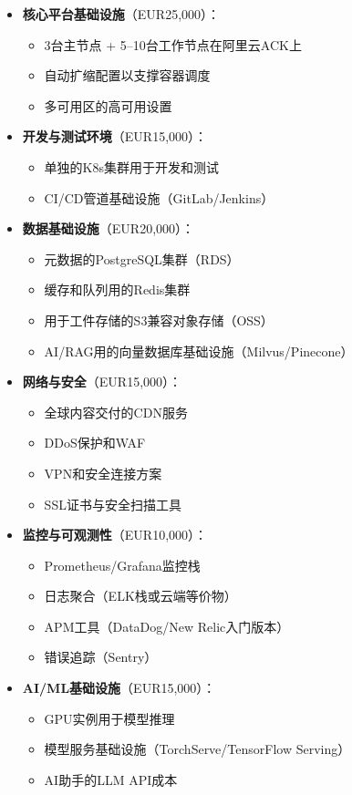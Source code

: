 \documentclass[11点, A4纸, 单面]{article}
\begin{document}
\begin{itemize}
    \item \textbf{核心平台基础设施}（EUR{25{,}000}）：
    \begin{itemize}
        \item 3台主节点 + 5--10台工作节点在阿里云ACK上
        \item 自动扩缩配置以支撑容器调度
        \item 多可用区的高可用设置
    \end{itemize}
    
    \item \textbf{开发与测试环境}（EUR{15{,}000}）：
    \begin{itemize}
        \item 单独的K8s集群用于开发和测试
        \item CI/CD管道基础设施（GitLab/Jenkins）
    \end{itemize}
    
    \item \textbf{数据基础设施}（EUR{20{,}000}）：
    \begin{itemize}
        \item 元数据的PostgreSQL集群（RDS）
        \item 缓存和队列用的Redis集群
        \item 用于工件存储的S3兼容对象存储（OSS）
        \item AI/RAG用的向量数据库基础设施（Milvus/Pinecone）
    \end{itemize}
    
    \item \textbf{网络与安全}（EUR{15{,}000}）：
    \begin{itemize}
        \item 全球内容交付的CDN服务
        \item DDoS保护和WAF
        \item VPN和安全连接方案
        \item SSL证书与安全扫描工具
    \end{itemize}
    
    \item \textbf{监控与可观测性}（EUR{10{,}000}）：
    \begin{itemize}
        \item Prometheus/Grafana监控栈
        \item 日志聚合（ELK栈或云端等价物）
        \item APM工具（DataDog/New Relic入门版本）
        \item 错误追踪（Sentry）
    \end{itemize}
    
    \item \textbf{AI/ML基础设施}（EUR{15{,}000}）：
    \begin{itemize}
        \item GPU实例用于模型推理
        \item 模型服务基础设施（TorchServe/TensorFlow Serving）
        \item AI助手的LLM API成本
    \end{itemize}
\end{itemize}
\end{document}
